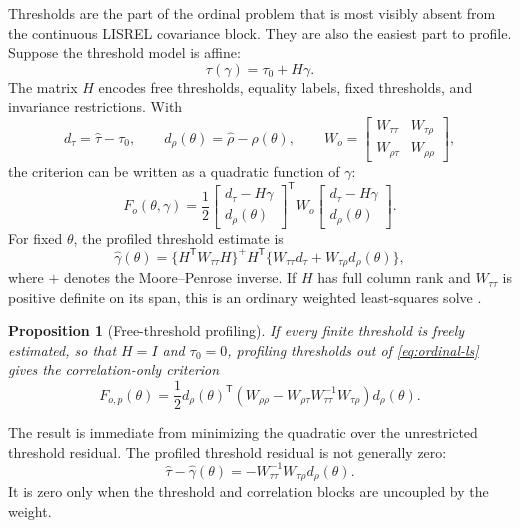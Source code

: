 \documentclass[11pt]{article}
\newtheorem{proposition}{Proposition}
\newcommand{\trans}{^{\mathsf T}}
\begin{document}
Thresholds are the part of the ordinal problem that is most visibly absent
from the continuous LISREL covariance block. They are also the easiest part to
profile. Suppose the threshold model is affine:
\begin{equation}
  \tau(\gamma)=\tau_0+H\gamma.
  \label{eq:threshold-affine}
\end{equation}
The matrix \(H\) encodes free thresholds, equality labels, fixed thresholds,
and invariance restrictions. With
\[
  d_\tau=\hat\tau-\tau_0,
  \qquad
  d_\rho(\theta)=\hat\rho-\rho(\theta),
  \qquad
  W_o=
  \begin{bmatrix}
    W_{\tau\tau} & W_{\tau\rho}\\
    W_{\rho\tau} & W_{\rho\rho}
  \end{bmatrix},
\]
the criterion can be written as a quadratic function of \(\gamma\):
\[
  F_o(\theta,\gamma)
  =
  \frac{1}{2}
  \begin{bmatrix}
    d_\tau-H\gamma \\
    d_\rho(\theta)
  \end{bmatrix}\trans
  W_o
  \begin{bmatrix}
    d_\tau-H\gamma \\
    d_\rho(\theta)
  \end{bmatrix}.
\]
For fixed \(\theta\), the profiled threshold estimate is
\begin{equation}
  \hat\gamma(\theta)
  =
  \{H\trans W_{\tau\tau}H\}^{+}
  H\trans
  \{W_{\tau\tau}d_\tau+W_{\tau\rho}d_\rho(\theta)\},
  \label{eq:threshold-profile-general}
\end{equation}
where \(+\) denotes the Moore--Penrose inverse. If \(H\) has full column rank
and \(W_{\tau\tau}\) is positive definite on its span, this is an ordinary
weighted least-squares solve \citep{golub2013matrix,magnus1999matrix}.

\begin{proposition}[Free-threshold profiling]
\label{prop:free-threshold}
If every finite threshold is freely estimated, so that \(H=I\) and
\(\tau_0=0\), profiling thresholds out of \eqref{eq:ordinal-ls} gives the
correlation-only criterion
\begin{equation}
  F_{o,p}(\theta)
  =
  \frac{1}{2}d_\rho(\theta)\trans
  \left(
    W_{\rho\rho}
    -
    W_{\rho\tau}W_{\tau\tau}^{-1}W_{\tau\rho}
  \right)
  d_\rho(\theta).
  \label{eq:threshold-schur}
\end{equation}
\end{proposition}

\noindent
The result is immediate from minimizing the quadratic over the unrestricted
threshold residual. The profiled threshold residual is not generally zero:
\[
  \hat\tau-\hat\gamma(\theta)
  =
  -W_{\tau\tau}^{-1}W_{\tau\rho}d_\rho(\theta).
\]
It is zero only when the threshold and correlation blocks are uncoupled by the
weight.
\end{document}

